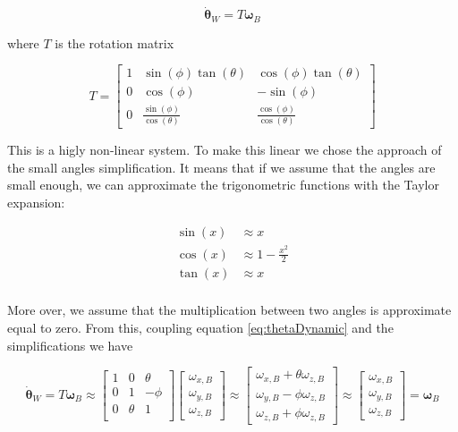 \begin{equation}
	\dot{\boldsymbol{\theta}}_W = T\boldsymbol{\omega}_B
	\label{eq:thetaDynamic}
\end{equation}

\noindent where $T$ is the rotation matrix

\begin{equation}
	T = 
	\begin{bmatrix}
		1 & \sin(\phi)\tan(\theta)          & \cos(\phi)\tan(\theta) \\
		0 & \cos(\phi)                      & -\sin(\phi)            \\
		0 & \frac{\sin(\phi)}{\cos(\theta)} & \frac{\cos(\phi)}{\cos(\theta)} 
	\end{bmatrix}
\end{equation}

\noindent This is a higly non-linear system. To make this linear we chose the approach of the small angles simplification. It means that if we assume that the angles are small enough, we can approximate the trigonometric functions with the Taylor expansion:

\begin{align*}
	\sin(x) &\approx x \\
	\cos(x) &\approx 1-\frac{x^2}{2} \\
	\tan(x) &\approx x \\
\end{align*}

\noindent More over, we assume that the multiplication between two angles is approximate equal to zero. From this, coupling equation \eqref{eq:thetaDynamic} and the simplifications we have

\begin{equation}
	\dot{\boldsymbol{\theta}}_W = T\boldsymbol{\omega}_B \approx 
	\begin{bmatrix}
		1 & 0      & \theta \\
		0 & 1      & -\phi  \\
		0 & \theta & 1 \\ 
	\end{bmatrix}
	\begin{bmatrix}
		\omega_{x,B} \\
		\omega_{y,B} \\
		\omega_{z,B}
	\end{bmatrix} \approx 
	\begin{bmatrix}
		\omega_{x,B}+\theta\omega_{z,B} \\
		\omega_{y,B}-\phi\omega_{z,B}   \\
		\omega_{z,B}+\phi\omega_{z,B}
	\end{bmatrix} \approx
	\begin{bmatrix}
		\omega_{x,B} \\
		\omega_{y,B} \\
		\omega_{z,B}
	\end{bmatrix}
	= \boldsymbol{\omega}_B
	\label{eq:MPCdyn4}
\end{equation}

